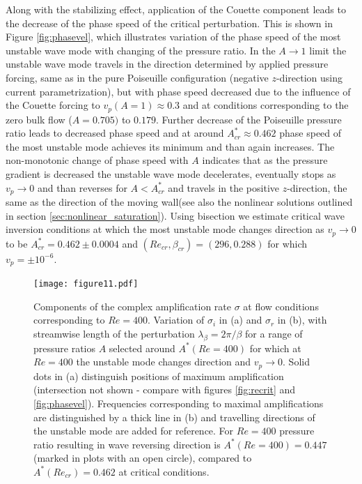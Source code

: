 \documentclass[lineno]{jfm}
\begin{document}
Along with the stabilizing effect, application of the Couette component leads to the decrease of the phase speed of the critical perturbation. This is shown in Figure \ref{fig:phasevel}, which illustrates variation of the phase speed  of the most unstable wave mode with changing of the pressure ratio.
In the $A\to1$ limit the unstable wave mode travels in the direction determined by applied pressure forcing, same as in the pure Poiseuille configuration (negative $z$-direction using current parametrization),
but with phase speed decreased due to the influence of the Couette forcing to $v_p(A=1)\approx0.3$ and at conditions corresponding to the zero bulk flow ($A=0.705)$ to $0.179$.
Further decrease of the Poiseuille pressure ratio leads to decreased phase speed and at around
$A^{*}_{cr}\approx0.462$ phase speed of the most unstable mode achieves its minimum and than again increases.
The non-monotonic change of phase speed  with $A$ indicates that as the pressure gradient is decreased the unstable wave mode decelerates, eventually stops as $v_p\to0$ and than reverses for $A<A^{*}_{cr}$ and travels in the positive $z$-direction, the same as the direction of the moving wall(see also the nonlinear solutions outlined in section \ref{sec:nonlinear_saturation}).
Using bisection we estimate critical wave inversion conditions at which the most unstable mode changes direction as $v_p\to0$
to be $A^{*}_{cr}= 0.462\pm 0.0004$ and $(Re_{cr}, \beta_{cr})=(296, 0.288)$ for which $v_p=\pm10^{-6}$.

\begin{figure}
\centering
	\texttt{[image: figure11.pdf]}  
	\caption{Components of the complex amplification rate $\sigma$ at flow conditions corresponding to $Re=400$.
	Variation of $\sigma_i$ in (a) and $\sigma_r$ in (b), with streamwise length of the perturbation $\lambda_\beta=2\pi/\beta$ for a range of pressure ratios $A$ selected around $A^*(Re=400)$ for which at $Re=400$ the unstable mode changes direction and $v_p\to0$.
    Solid dots in (a) distinguish positions of maximum amplification
    (intersection not shown - compare with figures \ref{fig:recrit} and \ref{fig:phasevel}). Frequencies corresponding to maximal amplifications are distinguished by a thick line in (b) and travelling directions of the unstable mode are added for reference.
    For $Re=400$ pressure ratio resulting in wave reversing direction is $A^*(Re=400)=0.447$ (marked in plots with an open circle), compared to $A^*(Re_{cr})=0.462$ at critical conditions.}
	\label{fig:re400}
\end{figure}
\end{document}
